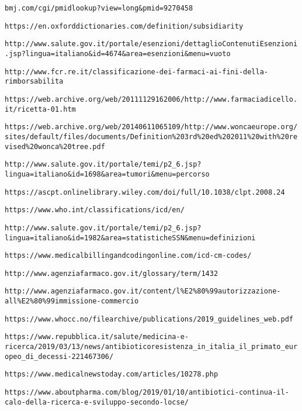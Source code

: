 \begin{thebibliography}{}
	\texttt{bmj.com/cgi/pmidlookup?view=long\&pmid=9270458}
	
	\texttt{https://en.oxforddictionaries.com/definition/subsidiarity}
	
	\texttt{http://www.salute.gov.it/portale/esenzioni/dettaglioContenutiEsenzioni.jsp?lingua=italiano\&id=4674\&area=esenzioni\&menu=vuoto}
	
	\texttt{http://www.fcr.re.it/classificazione-dei-farmaci-ai-fini-della-rimborsabilita}
	
	\texttt{https://web.archive.org/web/20111129162006/http://www.farmaciadicello.it/ricetta-01.htm}
	
	\texttt{https://web.archive.org/web/20140611065109/http://www.woncaeurope.org/sites/default/files/documents/Definition\%203rd\%20ed\%202011\%20with\%20revised\%20wonca\%20tree.pdf}
	
	\texttt{http://www.salute.gov.it/portale/temi/p2\_6.jsp?lingua=italiano\&id=1698\&area=tumori\&menu=percorso}
	
	\texttt{https://ascpt.onlinelibrary.wiley.com/doi/full/10.1038/clpt.2008.24}
	
	\texttt{https://www.who.int/classifications/icd/en/}
	
	\texttt{http://www.salute.gov.it/portale/temi/p2\_6.jsp?lingua=italiano\&id=1982\&area=statisticheSSN\&menu=definizioni}
	
	\texttt{https://www.medicalbillingandcodingonline.com/icd-cm-codes/}
	
	\texttt{http://www.agenziafarmaco.gov.it/glossary/term/1432}
	
	\texttt{http://www.agenziafarmaco.gov.it/content/l\%E2\%80\%99autorizzazione-all\%E2\%80\%99immissione-commercio}
	
	\texttt{https://www.whocc.no/filearchive/publications/2019\_guidelines\_web.pdf}
	
	\texttt{https://www.repubblica.it/salute/medicina-e-ricerca/2019/03/13/news/antibioticoresistenza\_in\_italia\_il\_primato\_europeo\_di\_decessi-221467306/}
	
	\texttt{https://www.medicalnewstoday.com/articles/10278.php}
	
	\texttt{https://www.aboutpharma.com/blog/2019/01/10/antibiotici-continua-il-calo-della-ricerca-e-sviluppo-secondo-locse/}
	

\end{thebibliography}
